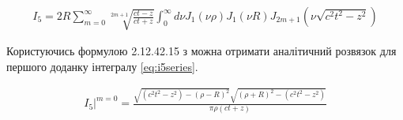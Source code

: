 %
%
%

\begin{equation} \begin{aligned} \label{eq:i5series}
I_5 = 2 R \sum_{m=0}^{\infty}
\sqrt[2m+1]{\frac{ct-z}{ct+z}}
\int_0^\infty d \nu J_1(\nu \rho) J_1(\nu R) 
J_{2m+1} \left( \nu \sqrt{c^2t^2 - z^2} \right)
\end{aligned}  \end{equation}

Користуючись формулою 2.12.42.15 з \cite{imp:SpecFunc1983} можна отримати 
аналітичний розвязок для першого доданку інтегралу \eqref{eq:i5series}.

%

\begin{equation} \begin{aligned} \label{eq:i50}
\left. I_5 \right|^{m=0} = \frac
{\sqrt{(c^2t^2 - z^2) - (\rho-R)^2}\sqrt{(\rho+R)^2 - (c^2t^2 - z^2)}}
{\pi \rho (ct+z)}
\end{aligned}  \end{equation}
